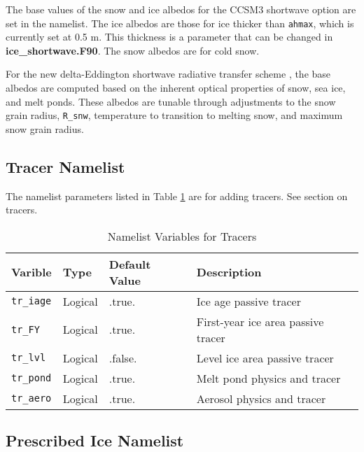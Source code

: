 The base values of the snow and ice albedos for the CCSM3 shortwave option
are set in the namelist.  The ice albedos are those for ice thicker than 
{\tt ahmax}, which is currently set at 0.5 m.  This thickness is a parameter 
that can be changed in {\bf ice\_shortwave.F90}. The snow albedos are for 
cold snow. 

For the new delta-Eddington shortwave radiative transfer scheme 
\cite{Briegleb07}, the base albedos are computed based on the inherent 
optical properties of snow, sea ice, and melt ponds. These albedos are 
tunable through adjustments to the snow grain radius, {\tt R\_snw}, 
temperature to transition to melting snow, and maximum snow grain radius.

\subsection{Tracer Namelist}

The namelist parameters listed in Table \ref{table:tracer_nml} are for
adding tracers. See section on tracers.

\begin{table}
  \begin{center}
  \caption{Namelist Variables for Tracers}
  \label{table:tracer_nml}
  \begin{tabular}{p{2.5cm}p{2.5cm}p{3cm}p{6.0cm}} \hline
  Varible & Type & Default Value & Description               \\
\hline \hline

{\tt tr\_iage} & Logical & .true. &  Ice age passive tracer \\

{\tt tr\_FY} & Logical & .true. &  First-year ice area passive tracer \\

{\tt tr\_lvl} & Logical & .false. &  Level ice area passive tracer \\

{\tt tr\_pond} & Logical & .true. &  Melt pond physics and tracer \\

{\tt tr\_aero} & Logical & .true. &  Aerosol physics and tracer \\

  \hline
  \end{tabular}
  \end{center}
\end{table}

\subsection{Prescribed Ice Namelist}

